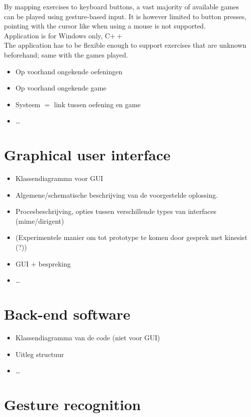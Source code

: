 By mapping exercises to keyboard buttons, a vast majority of available games can be played using gesture-based input. It is however limited to button presses, pointing with the cursor like when using a mouse is not supported.\\

Application is for Windows only, C$++$\\

The application has to be flexible enough to support exercises that are unknown beforehand; same with the games played.

\begin{itemize}
\item Op voorhand ongekende oefeningen
\item Op voorhand ongekende game
\item Systeem $=$ link tussen oefening en game
\item \ldots
\end{itemize}


\section{Graphical user interface}

\begin{itemize}
\item Klassendiagramma voor GUI
\item Algemene/schematische beschrijving van de voorgestelde oplossing.
\item Procesbeschrijving, opties tussen verschillende types van interfaces (mime/dirigent)
\item (Experimentele manier om tot prototype te komen door gesprek met kinesist (?))
\item GUI $+$ bespreking
\item \ldots
\end{itemize}


\section{Back-end software}

\begin{itemize}
\item Klassendiagramma van de code (niet voor GUI)
\item Uitleg structuur
\item \ldots
\end{itemize}


\section{Gesture recognition}


